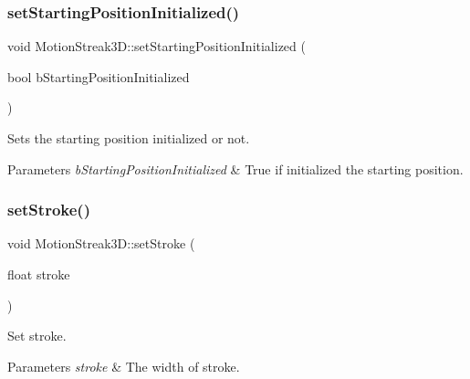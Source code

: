 \subsubsection{\texorpdfstring{set\+Starting\+Position\+Initialized()}{setStartingPositionInitialized()}\hspace{0.1cm}{\footnotesize\ttfamily [2/2]}}
{\footnotesize\ttfamily void Motion\+Streak3\+D\+::set\+Starting\+Position\+Initialized (\begin{DoxyParamCaption}\item[{bool}]{b\+Starting\+Position\+Initialized }\end{DoxyParamCaption})\hspace{0.3cm}{\ttfamily [inline]}}

Sets the starting position initialized or not.


\begin{DoxyParams}{Parameters}
{\em b\+Starting\+Position\+Initialized} & True if initialized the starting position. \\
\hline
\end{DoxyParams}
\mbox{\label{classMotionStreak3D_a7e5feedbf87874e24710d564d16d4649}} 
\subsubsection{\texorpdfstring{set\+Stroke()}{setStroke()}\hspace{0.1cm}{\footnotesize\ttfamily [1/2]}}
{\footnotesize\ttfamily void Motion\+Streak3\+D\+::set\+Stroke (\begin{DoxyParamCaption}\item[{float}]{stroke }\end{DoxyParamCaption})\hspace{0.3cm}{\ttfamily [inline]}}

Set stroke.


\begin{DoxyParams}{Parameters}
{\em stroke} & The width of stroke. \\
\hline
\end{DoxyParams}
\mbox{\label{classMotionStreak3D_a7e5feedbf87874e24710d564d16d4649}} 
